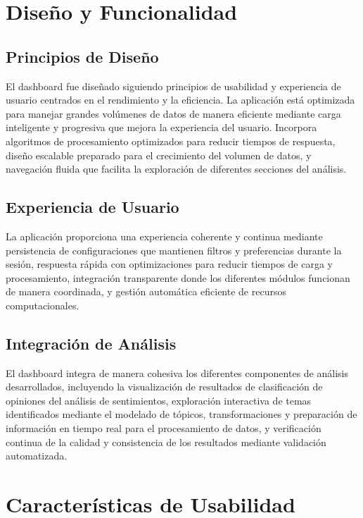 \documentclass[12pt,a4paper,twoside,openany]{book}
\begin{document}
\section{Diseño y Funcionalidad}

\subsection{Principios de Diseño}

El dashboard fue diseñado siguiendo principios de usabilidad y experiencia de usuario centrados en el rendimiento y la eficiencia. La aplicación está optimizada para manejar grandes volúmenes de datos de manera eficiente mediante carga inteligente y progresiva que mejora la experiencia del usuario. Incorpora algoritmos de procesamiento optimizados para reducir tiempos de respuesta, diseño escalable preparado para el crecimiento del volumen de datos, y navegación fluida que facilita la exploración de diferentes secciones del análisis.

\subsection{Experiencia de Usuario}

La aplicación proporciona una experiencia coherente y continua mediante persistencia de configuraciones que mantienen filtros y preferencias durante la sesión, respuesta rápida con optimizaciones para reducir tiempos de carga y procesamiento, integración transparente donde los diferentes módulos funcionan de manera coordinada, y gestión automática eficiente de recursos computacionales.

\subsection{Integración de Análisis}

El dashboard integra de manera cohesiva los diferentes componentes de análisis desarrollados, incluyendo la visualización de resultados de clasificación de opiniones del análisis de sentimientos, exploración interactiva de temas identificados mediante el modelado de tópicos, transformaciones y preparación de información en tiempo real para el procesamiento de datos, y verificación continua de la calidad y consistencia de los resultados mediante validación automatizada.

\section{Características de Usabilidad}
\end{document}
